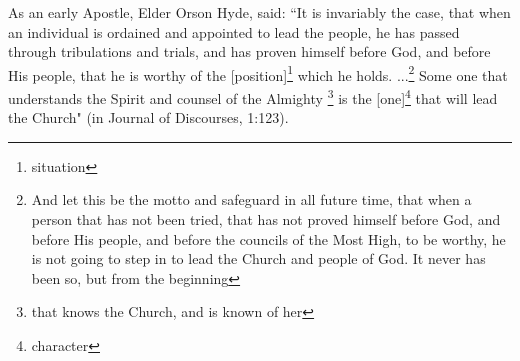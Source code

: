 As an early Apostle, Elder Orson Hyde, said: ``It is invariably the case, that when an individual is ordained and appointed to lead the people, he has passed through tribulations and trials, and has proven himself before God, and before His people, that he is worthy of the [position]\footnote{situation} which he holds. ...\footnote{And let this be the motto and safeguard in all future time, that when a person that has not been tried, that has not proved himself before God, and before His people, and before the councils of the Most High, to be worthy, he is not going to step in to lead the Church and people of God. It never has been so, but from the beginning} Some one that understands the Spirit and counsel of the Almighty \footnote{that knows the Church, and is known of her} is the [one]\footnote{character} that will lead the Church" (in Journal of Discourses, 1:123).
